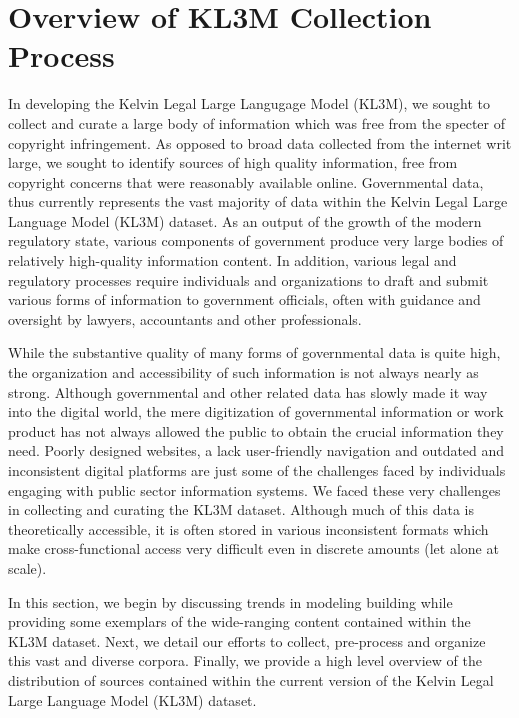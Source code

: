 \section{Overview of KL3M Collection Process}
In developing the Kelvin Legal Large Langugage Model (KL3M), we sought to collect and curate a large body of information which was free from the specter of copyright infringement. As opposed to broad data collected from the internet writ large, we sought to identify sources of high quality information, free from copyright concerns that were reasonably available online.  Governmental data, thus currently represents the vast majority of data within the Kelvin Legal Large Language Model (KL3M) dataset. As an output of the growth of the modern regulatory state,\cite{katz2020complex}\cite{coupette2021measuring} various components of government produce very large bodies of relatively high-quality information content.  In addition, various legal and regulatory processes require individuals and organizations to draft and submit various forms of information to government officials, often with guidance and oversight by lawyers, accountants and other professionals.  

While the substantive quality of many forms of governmental data is quite high, the organization and accessibility of such information is not always nearly as strong.  Although governmental and other related data has slowly made it way into the digital world, the mere digitization of governmental information or work product has not always allowed the public to obtain the crucial information they need.  Poorly designed websites, a lack user-friendly navigation and outdated and inconsistent digital platforms are just some of the challenges faced by individuals engaging with public sector information systems.  We faced these very challenges in collecting and curating the KL3M dataset. Although much of this data is theoretically accessible, it is often stored in various inconsistent formats which make cross-functional access very difficult even in discrete amounts (let alone at scale). 

In this section, we begin by discussing trends in modeling building while providing some exemplars of the wide-ranging content contained within the KL3M dataset.  Next, we detail our efforts to collect, pre-process and organize this vast and diverse corpora.  Finally, we provide a high level overview of the distribution of sources contained within the current version of the Kelvin Legal Large Language Model (KL3M) dataset. 
  
